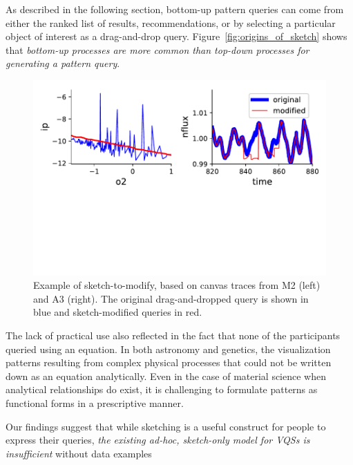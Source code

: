  As described in the following section,
 bottom-up pattern queries can come from either
 the ranked list of results,
 recommendations, or by selecting a
 particular object of interest as a drag-and-drop query.
 Figure~\ref{fig:origins_of_sketch} shows that
 \emph{bottom-up processes are more common
 than top-down processes for generating a pattern query}.
 \begin{figure}[h!]
     \centering
     \includegraphics[width=\columnwidth]{figures/QueryModificationBySketch.pdf}
     \caption{Example of sketch-to-modify, based on canvas traces from M2 (left) and A3 (right). The original drag-and-dropped query is shown in blue and sketch-modified queries in red.}%
     \label{query_modification}
     \vspace{-10pt}
 \end{figure}
 \par The lack of practical use  also reflected in the fact
 that none of the participants queried using an equation.
 In both astronomy and genetics, the visualization patterns
 resulting from complex physical processes
 that could not be written down as an equation analytically.
 Even in the case of material science when analytical
 relationships do exist, it is challenging to formulate patterns as functional forms in a prescriptive manner.
 \par Our findings suggest that while sketching
 is a useful construct for people to express their queries,
 \emph{the existing ad-hoc, sketch-only model for VQSs
 is insufficient } without data examples
